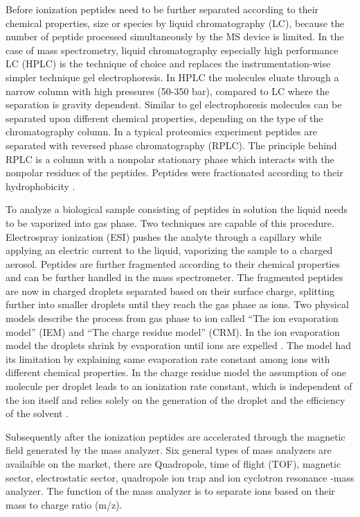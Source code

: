 \documentclass[
  11pt,
]{article}
\begin{document}
Before ionization peptides need to be further separated according to their chemical properties, size or species by liquid chromatography (LC), because the number of peptide processed simultaneously by the MS device is limited. In the case of mass spectrometry, liquid chromatography especially high performance LC (HPLC) is the technique of choice and replaces the instrumentation-wise simpler technique gel electrophoresis. In HPLC the molecules eluate through a narrow column with high pressures (50-350 bar), compared to LC where the separation is gravity dependent. Similar to gel electrophoresis molecules can be separated upon different chemical properties, depending on the type of the chromatography column. In a typical proteomics experiment peptides are separated with reversed phase chromatography (RPLC). The principle behind RPLC is a column with a nonpolar stationary phase which interacts with the nonpolar residues of the peptides. Peptides were fractionated according to their hydrophobicity \citep{Pitt2009}.

To analyze a biological sample consisting of peptides in solution the liquid needs to be vaporized into gas phase. Two techniques are capable of this procedure. Electrospray ionization (ESI) pushes the analyte through a capillary while applying an electric current to the liquid, vaporizing the sample to a charged aerosol. Peptides are further fragmented according to their chemical properties and can be further handled in the mass spectrometer. The fragmented peptides are now in charged droplets separated based on their surface charge, splitting further into smaller droplets until they reach the gas phase as ions. Two physical models describe the process from gas phase to ion called ``The ion evaporation model'' (IEM) and ``The charge residue model'' (CRM).
In the ion evaporation model the droplets shrink by evaporation until ions are expelled \citep{Iribarne1976}. The model had its limitation by explaining same evaporation rate constant among ions with different chemical properties. In the charge residue model the assumption of one molecule per droplet leads to an ionization rate constant, which is independent of the ion itself and relies solely on the generation of the droplet and the efficiency of the solvent \citep{Wilm2011}.

Subsequently after the ionization peptides are accelerated through the magnetic field generated by the mass analyzer. Six general types of mass analyzers are availaible on the market, there are Quadropole, time of flight (TOF), magnetic sector, electrostatic sector, quadropole ion trap and ion cyclotron resonance -mass analyzer. The function of the mass analyzer is to separate ions based on their mass to charge ratio (m/z).
\end{document}
